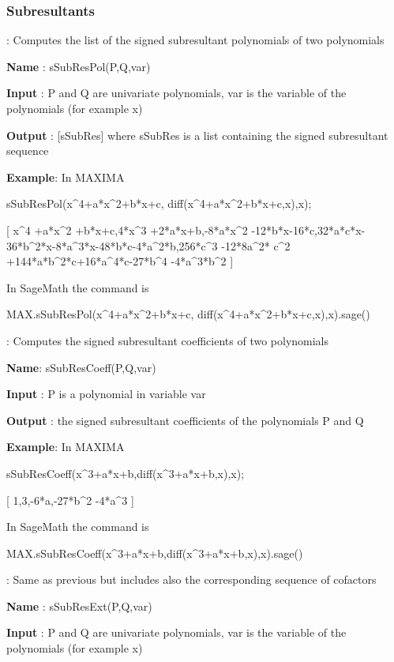 \documentclass{article}
\begin{document}
\subsubsection{Subresultants}

:  Computes the list of the signed subresultant polynomials of two
  polynomials
  
{\bf Name} : sSubResPol(P,Q,var)
  
{\bf Input} : P and Q are univariate polynomials, var is the variable of the polynomials (for example x)
  
 {\bf Output} : [sSubRes] where sSubRes is a list containing the signed
  subresultant sequence
  
{\bf Example}: In MAXIMA

sSubResPol(x\^{}4+a*x\^{}2+b*x+c, diff(x\^{}4+a*x\^{}2+b*x+c,x),x);

[ x\^{}{4} +a*x\^{}{2} +b*x+c,4*x\^{}{3} +2*a*x+b,-8*a*x\^{}{2} -12*b*x-16*c,32*a*c*x-36*b\^{}{2}*x-8*a\^{}{3}*x-48*b*c-4*a\^{}{2}*b,256*c\^{}{3} -12*8a\^{}{2}* c\^{}{2} +144*a*b\^{}{2}*c+16*a\^{}{4}*c-27*b\^{}{4} -4*a\^{}{3}*b\^{}{2} ]
  
  \noindent In SageMath the command is
  
  MAX.sSubResPol(x\^{}4+a*x\^{}2+b*x+c,
  diff(x\^{}4+a*x\^{}2+b*x+c,x),x).sage()
  
  
:
  Computes the signed subresultant coefficients of two polynomials
  
 {\bf Name}: sSubResCoeff(P,Q,var)
  
  {\bf Input} : P is a polynomial in variable var
  
 {\bf Output} : the signed subresultant coefficients of the polynomials P and Q
  
 
   {\bf Example}: In MAXIMA

sSubResCoeff(x\^{}3+a*x+b,diff(x\^{}3+a*x+b,x),x);

 [ 1,3,-6*a,-27*b\^{}{2} -4*a\^{}{3} ]
  
  \noindent In SageMath the command is
  
  MAX.sSubResCoeff(x\^{}3+a*x+b,diff(x\^{}3+a*x+b,x),x).sage()
  

: Same as previous but includes also the corresponding sequence of cofactors
  
{\bf Name} : sSubResExt(P,Q,var)
  
{\bf Input} : P and Q are univariate  polynomials, var is the variable of the polynomials (for example x)
  
\end{document}
